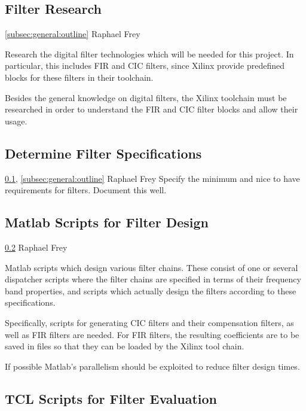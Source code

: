 \documentclass[a4paper,oneside]{alpenspecs/alpenspecs}
\begin{document}
\subsection{Filter Research}
\label{subsec:filter:research}

\wpac
    {}
    {}
    {}
    {\ref{subsec:general:outline}}
    {}
    {Raphael Frey}
    {%
        Research the digital filter technologies which will be needed for this
        project. In particular, this includes FIR and CIC filters, since Xilinx
        provide predefined blocks for these filters in their toolchain.

        Besides the general knowledge on digital filters, the Xilinx toolchain
        must be researched in order to understand the FIR and CIC filter blocks
        and allow their usage.
    }

\subsection{Determine Filter Specifications}
\label{subsec:filter:specification}

\wpac
    {}
    {}
    {}
    {\ref{subsec:filter:research}, \ref{subsec:general:outline}}
    {}
    {Raphael Frey}
    {%
        Specify the minimum and nice to have requirements for filters.
        Document this well.
    }

\subsection{Matlab Scripts for Filter Design}
\label{subsec:filter:matlab}

\wpac
    {}
    {}
    {}
    {\ref{subsec:filter:specification}}
    {}
    {Raphael Frey}
    {%
        Matlab scripts which design various filter chains. These consist of one
        or several dispatcher scripts where the filter chains are specified in
        terms of their frequency band properties, and scripts which actually
        design the filters according to these specifications.

        Specifically, scripts for generating CIC filters and their compensation
        filters, as well as FIR filters are needed. For FIR filters, the resulting
        coefficients are to be saved in files so that they can be loaded by the
        Xilinx tool chain.

        If possible Matlab's parallelism should be exploited to reduce filter
        design times.
    }

\subsection{TCL Scripts for Filter Evaluation}
\label{subsec:filter:tcl}
\end{document}
